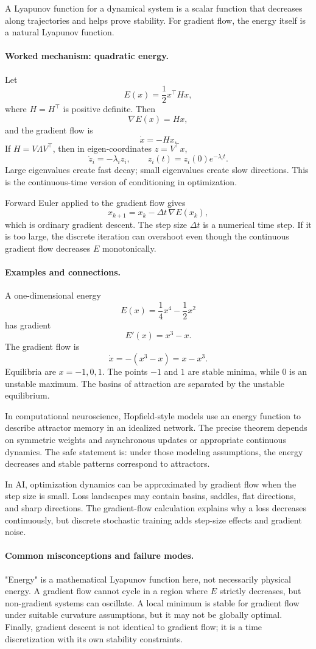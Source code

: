 A Lyapunov function for a dynamical system is a scalar function that decreases along trajectories and helps prove stability. For gradient flow, the energy itself is a natural Lyapunov function.

\paragraph{Worked mechanism: quadratic energy.}
Let
\[
E(x)=\frac12 x^\top Hx,
\]
where \(H=H^\top\) is positive definite. Then
\[
\nabla E(x)=Hx,
\]
and the gradient flow is
\[
\dot x=-Hx.
\]
If \(H=V\Lambda V^\top\), then in eigen-coordinates \(z=V^\top x\),
\[
\dot z_i=-\lambda_i z_i,
\qquad
z_i(t)=z_i(0)e^{-\lambda_i t}.
\]
Large eigenvalues create fast decay; small eigenvalues create slow directions. This is the continuous-time version of conditioning in optimization.

Forward Euler applied to the gradient flow gives
\[
x_{k+1}=x_k-\Delta t\,\nabla E(x_k),
\]
which is ordinary gradient descent. The step size \(\Delta t\) is a numerical time step. If it is too large, the discrete iteration can overshoot even though the continuous gradient flow decreases \(E\) monotonically.

\paragraph{Examples and connections.}
A one-dimensional energy
\[
E(x)=\frac14x^4-\frac12x^2
\]
has gradient
\[
E'(x)=x^3-x.
\]
The gradient flow is
\[
\dot x=-(x^3-x)=x-x^3.
\]
Equilibria are \(x=-1,0,1\). The points \(-1\) and \(1\) are stable minima, while \(0\) is an unstable maximum. The basins of attraction are separated by the unstable equilibrium.

In computational neuroscience, Hopfield-style models use an energy function to describe attractor memory in an idealized network. The precise theorem depends on symmetric weights and asynchronous updates or appropriate continuous dynamics. The safe statement is: under those modeling assumptions, the energy decreases and stable patterns correspond to attractors.

In AI, optimization dynamics can be approximated by gradient flow when the step size is small. Loss landscapes may contain basins, saddles, flat directions, and sharp directions. The gradient-flow calculation explains why a loss decreases continuously, but discrete stochastic training adds step-size effects and gradient noise.

\paragraph{Common misconceptions and failure modes.}
"Energy" is a mathematical Lyapunov function here, not necessarily physical energy. A gradient flow cannot cycle in a region where \(E\) strictly decreases, but non-gradient systems can oscillate. A local minimum is stable for gradient flow under suitable curvature assumptions, but it may not be globally optimal. Finally, gradient descent is not identical to gradient flow; it is a time discretization with its own stability constraints.

